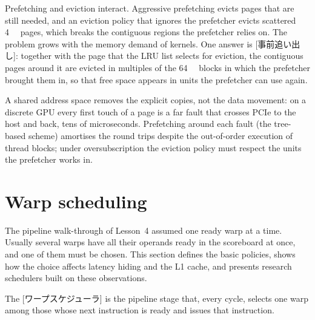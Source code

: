 \documentclass[../main.tex]{subfiles}
\begin{document}
%
Prefetching and eviction interact.  Aggressive prefetching evicts
pages that are still needed, and an eviction policy that ignores the
prefetcher evicts scattered \SI{4}{\kibi\byte} pages, which breaks the
contiguous regions the prefetcher relies on.  The problem grows with
the memory demand of kernels.  One answer is
[事前追い出し]: together with the page that the
LRU list selects for eviction, the contiguous pages around it are
evicted in multiples of the \SI{64}{\kibi\byte} blocks in which the
prefetcher brought them in, so that free space appears in units the
prefetcher can use again.

\begin{keypoint}
  A shared address space removes the explicit copies, not the data
  movement: on a discrete GPU every first touch of a page is a far
  fault that crosses PCIe to the host and back, tens of microseconds.
  Prefetching around each fault (the tree-based scheme) amortises the
  round trips despite the out-of-order execution of thread blocks;
  under oversubscription the eviction policy must respect the units
  the prefetcher works in.
\end{keypoint}

\section{Warp scheduling}
\label{sec:l07-scheduling}

The pipeline walk-through of Lesson~4 assumed one ready warp at a
time.  Usually several warps have
all their operands ready in the scoreboard at once, and one of them
must be chosen.  This section defines the basic policies, shows how the
choice affects latency hiding and the L1 cache, and presents research
schedulers built on these observations.

\begin{definition}
  \label{def:l07-warp-scheduler}
  The [ワープスケジューラ] is the pipeline stage
  that, every cycle, selects one warp among those whose next
  instruction is ready and issues that instruction.
\end{definition}
\end{document}
